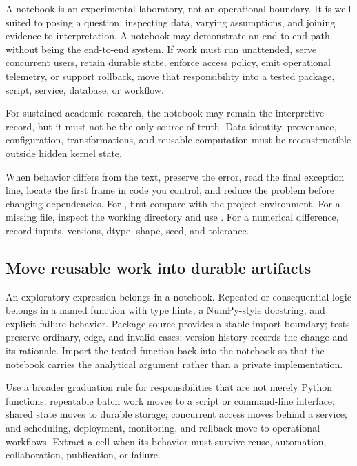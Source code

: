 \begin{professionalbox}
A notebook is an experimental laboratory, not an operational boundary. It is
well suited to posing a question, inspecting data, varying assumptions, and
joining evidence to interpretation. A notebook may demonstrate an end-to-end
path without being the end-to-end system. If work must run unattended, serve
concurrent users, retain durable state, enforce access policy, emit operational
telemetry, or support rollback, move that responsibility into a tested package,
script, service, database, or workflow.

For sustained academic research, the notebook may remain the interpretive
record, but it must not be the only source of truth. Data identity, provenance,
configuration, transformations, and reusable computation must be reconstructible
outside hidden kernel state.
\end{professionalbox}

When behavior differs from the text, preserve the error, read the final
exception line, locate the first frame in code you control, and reduce the
problem before changing dependencies. For , first
compare  with the project environment. For a missing file,
inspect the working directory and use . For a numerical
difference, record inputs, versions, dtype, shape, seed, and tolerance.

\subsection{Move reusable work into durable artifacts}

An exploratory expression belongs in a notebook. Repeated or consequential
logic belongs in a named function with type hints, a NumPy-style docstring, and
explicit failure behavior. Package source provides a stable import boundary;
tests preserve ordinary, edge, and invalid cases; version history records the
change and its rationale. Import the tested function back into the notebook so
that the notebook carries the analytical argument rather than a private
implementation.

Use a broader graduation rule for responsibilities that are not merely Python
functions: repeatable batch work moves to a script or command-line interface;
shared state moves to durable storage; concurrent access moves behind a service;
and scheduling, deployment, monitoring, and rollback move to operational
workflows. Extract a cell when its behavior must survive reuse, automation,
collaboration, publication, or failure.

